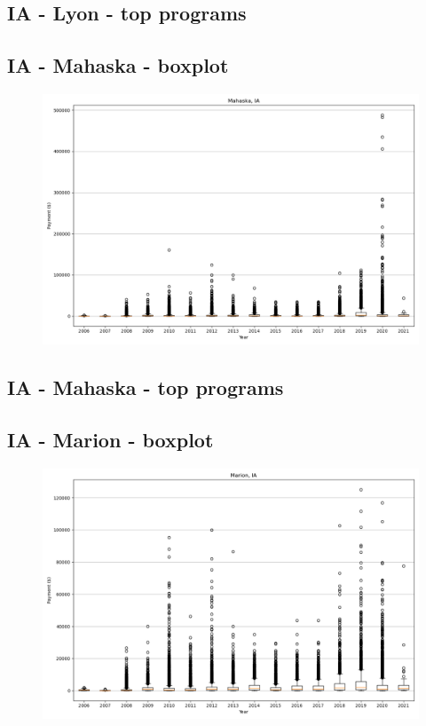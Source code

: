 \subsection*{IA - Lyon - top programs}

\newpage
\subsection*{IA - Mahaska - boxplot}
\begin{figure}[h]
\centering
\includegraphics[width=7in]{../output/boxplots/counties/Mahaska-IA_boxplot.png}
\end{figure}


\subsection*{IA - Mahaska - top programs}

\newpage
\subsection*{IA - Marion - boxplot}
\begin{figure}[h]
\centering
\includegraphics[width=7in]{../output/boxplots/counties/Marion-IA_boxplot.png}
\end{figure}


